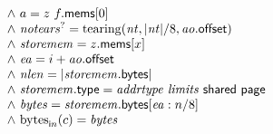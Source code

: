 $$\begin{array}[t]{@{}lrcl@{}l@{}}
{\begin{array}[t]{@{}l@{}}
{\land}~ a = z~f{.}\mathsf{mems}{}[0] \\
{\land}~ {{\mathit{notears}}^?} = {\mathrm{tearing}}({\mathit{nt}}, {|{\mathit{nt}}|} / 8, {\mathit{ao}}{.}\mathsf{offset}) \\
{\land}~ {\mathit{storemem}} = z{.}\mathsf{mems}{}[x] \\
{\land}~ {\mathit{ea}} = i + {\mathit{ao}}{.}\mathsf{offset} \\
{\land}~ {\mathit{nlen}} = {|{\mathit{storemem}}{.}\mathsf{bytes}|} \\
{\land}~ {\mathit{storemem}}{.}\mathsf{type} = {\mathit{addrtype}}~{\mathit{limits}}~\mathsf{shared}~\mathsf{page} \\
{\land}~ {\mathit{bytes}} = {\mathit{storemem}}{.}\mathsf{bytes}{}[{\mathit{ea}} : n / 8] \\
{\land}~ {{\mathrm{bytes}}}_{{\mathsf{i}}{n}}(c) = {\mathit{bytes}} \\
\end{array}
} \\
\end{array}
$$

\vspace{1ex}

